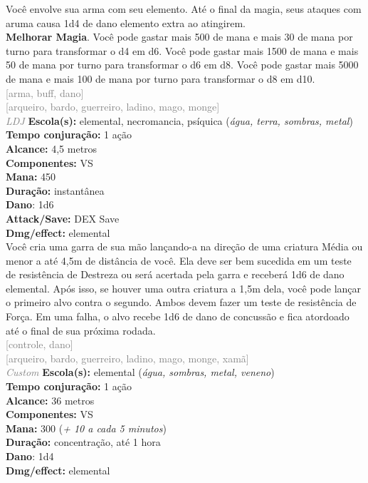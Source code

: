 \documentclass{RPG_Adventure}[2021/10/20]
\begin{document}
{\normalsize Você envolve sua arma com seu elemento. Até o final da magia, seus ataques com aruma causa 1d4 de dano elemento extra ao atingirem.\\\t \textbf{Melhorar Magia}. Você pode gastar mais 500 de mana e mais 30 de mana por turno para transformar o d4 em d6. Você pode gastar mais 1500 de mana e mais 50 de mana por turno para transformar o d6 em d8. Você pode gastar mais 5000 de mana e mais 100 de mana por turno para transformar o d8 em d10.\\}
{\scriptsize \textcolor{gray}{[arma, buff, dano]\\}}
{\scriptsize \textcolor{gray}{[arqueiro, bardo, guerreiro, ladino, mago, monge]\\}}
{\tiny \textcolor{gray}{\textit{LDJ}}}\jump{}
{\small \t \textbf{Escola(s):} elemental, necromancia, psíquica (\textit{água, terra, sombras, metal})\\\t \textbf{Tempo conjuração:} 1 ação\\\t \textbf{Alcance:} 4,5 metros\\\t \textbf{Componentes:} VS\\\t \textbf{Mana:} 450\\\t \textbf{Duração:} instantânea\\\t \textbf{Dano}: 1d6\\\t \textbf{Attack/Save:} DEX Save\\\t \textbf{Dmg/effect:} elemental\\}
{\normalsize Você cria uma garra de sua mão lançando-a na direção de uma criatura Média ou menor a até 4,5m de distância de você. Ela deve ser bem sucedida em um teste de resistência de Destreza ou será acertada pela garra e receberá 1d6 de dano elemental. Após isso, se houver uma outra criatura a 1,5m dela, você pode lançar o primeiro alvo contra o segundo. Ambos devem fazer um teste de resistência de Força. Em uma falha, o alvo recebe 1d6 de dano de concussão e fica atordoado até o final de sua próxima rodada.\\}
{\scriptsize \textcolor{gray}{[controle, dano]\\}}
{\scriptsize \textcolor{gray}{[arqueiro, bardo, guerreiro, ladino, mago, monge, xamã]\\}}
{\tiny \textcolor{gray}{\textit{Custom}}}\jump{}
{\small \t \textbf{Escola(s):} elemental (\textit{água, sombras, metal, veneno})\\\t \textbf{Tempo conjuração:} 1 ação\\\t \textbf{Alcance:} 36 metros\\\t \textbf{Componentes:} VS\\\t \textbf{Mana:} 300 (\textit{+ 10 a cada 5 minutos})\\\t \textbf{Duração:} concentração, até 1 hora\\\t \textbf{Dano}: 1d4\\\t \textbf{Dmg/effect:} elemental\\}
\end{document}
